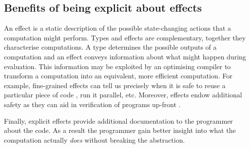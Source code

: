 \subsection{Benefits of being explicit about effects}
An effect is a static description of the possible state-changing actions that a computation might perform. Types and effects are complementary, together they characterise computations. A type determines the possible outputs of a computation and an effect conveys information about what might happen during evaluation. This information may be exploited by an optimising compiler to transform a computation into an equivalent, more efficient computation. For example, fine-grained effects can tell us precisely when it is safe to reuse a particular piece of code \cite{Kammar2012}, run it parallel, etc. Moreover, effects endow additional safety as they can aid in verification of programs up-front \cite{Brady2013}.

Finally, explicit effects provide additional documentation to the programmer about the code. As a result the programmer gain better insight into what the computation actually \emph{does} without breaking the abstraction.

